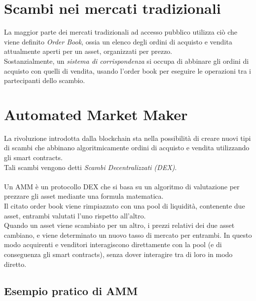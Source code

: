 \documentclass[12pt,a4paper]{report}
\begin{document}
\section{Scambi nei mercati tradizionali}

La maggior parte dei mercati tradizionali ad accesso pubblico utilizza ciò che viene definito \textit{Order Book}\cite{order_book}, ossia un elenco degli ordini di acquisto e vendita attualmente aperti per un asset, organizzati per prezzo.
\\Sostanzialmente, un \textit{sistema di corrispondenza}\cite{matching} si occupa di abbinare gli ordini di acquisto con quelli di vendita, usando l'order book per eseguire le operazioni tra i partecipanti dello scambio.


\section{Automated Market Maker}

La rivoluzione introdotta dalla blockchain sta nella possibilità di creare nuovi tipi di scambi che abbinano algoritmicamente ordini di acquisto e vendita utilizzando gli smart contracts.
\\Tali scambi vengono detti \textit{Scambi Decentralizzati (DEX)}.
\\\\Un AMM è un protocollo DEX che si basa su un algoritmo di valutazione per prezzare gli asset mediante una formula matematica.
\\Il citato order book viene rimpiazzato con una pool di liquidità\cite{liquidity_pool}, contenente due asset, entrambi valutati l'uno rispetto all'altro.
\\Quando un asset viene scambiato per un altro, i prezzi relativi dei due asset cambiano, e viene determinato un nuovo tasso di mercato per entrambi.
In questo modo acquirenti e venditori interagiscono direttamente con la pool (e di conseguenza gli smart contracts), senza dover interagire tra di loro in modo diretto.

\subsection{Esempio pratico di AMM}
\end{document}
